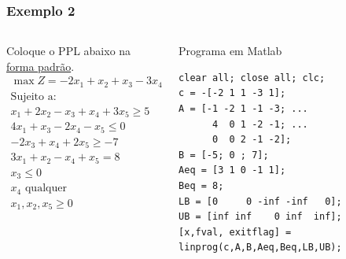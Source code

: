 \begin{frame}[fragile]
	\frametitle{Exemplo 2}
	\begin{columns}
		\begin{column}{0.5\textwidth}
		\begin{block}{Coloque o PPL abaixo na \underline{forma padrão}.}
			\begin{equation*}
				\begin{matrix}
					\scriptstyle \max Z = -2x_1+x_2+x_3-3x_4+x_5 \\
					\scriptstyle \text{Sujeito a:} \\
					\scriptstyle x_1+2x_2-x_3+x_4+3x_5 \ge 5 \\
					\scriptstyle 4x_1+x_3-2x_4-x_5 \le 0 \\
					\scriptstyle -2x_3+x_4+2x_5\ge -7 \\
					\scriptstyle 3x_1+x_2-x_4+x_5 = 8 \\
					\scriptstyle x_3 \le 0 \\
					\scriptstyle x_4 \text{ qualquer} \\
					\scriptstyle x_1, x_2, x_5 \ge 0 \\
				\end{matrix}
			\end{equation*}
		\end{block}
		\end{column}
		\begin{column}{0.5\textwidth}
			\begin{block}{Programa em Matlab}
				\begin{lstlisting}[basicstyle=\tiny]  
clear all; close all; clc;
c = -[-2 1 1 -3 1];
A = [-1 -2 1 -1 -3; ...
      4  0 1 -2 -1; ...
      0  0 2 -1 -2];
B = [-5; 0 ; 7];
Aeq = [3 1 0 -1 1];
Beq = 8;
LB = [0     0 -inf -inf   0]; 
UB = [inf inf    0 inf  inf];
[x,fval, exitflag] = linprog(c,A,B,Aeq,Beq,LB,UB);
				\end{lstlisting}
			\end{block}
		\end{column}
	\end{columns}
\end{frame}

